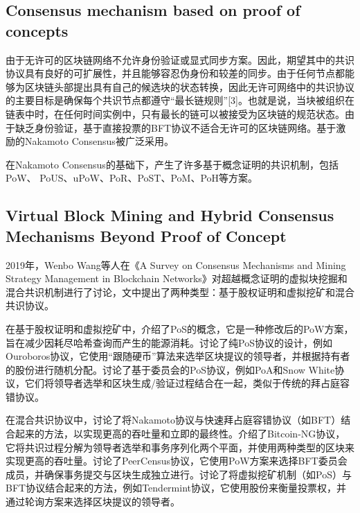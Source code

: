 \documentclass[a4paper,twoside]{scrbook}
\begin{document}
\begin{CJK}{UTF8}{gbsn}
\subsection{Consensus mechanism based on proof of concepts}
由于无许可的区块链网络不允许身份验证或显式同步方案。因此，期望其中的共识协议具有良好的可扩展性，并且能够容忍伪身份和较差的同步。由于任何节点都能够为区块链头部提出具有自己的候选块的状态转换，因此无许可网络中的共识协议的主要目标是确保每个共识节点都遵守“最长链规则”[3]。也就是说，当块被组织在链表中时，在任何时间实例中，只有最长的链可以被接受为区块链的规范状态。由于缺乏身份验证，基于直接投票的BFT协议不适合无许可的区块链网络。基于激励的Nakamoto Consensus\cite{nakamoto2008bitcoin}被广泛采用。

在Nakamoto Consensus的基础下，产生了许多基于概念证明的共识机制，包括PoW、
PoUS、uPoW、PoR、PoST、PoM、PoH等方案。

\subsection{Virtual Block Mining and Hybrid Consensus Mechanisms Beyond Proof of Concept}
2019年，Wenbo Wang等人在《A Survey on Consensus Mechanisms and Mining Strategy Management in Blockchain Networks》\cite{wang2019survey}对超越概念证明的虚拟块挖掘和混合共识机制进行了讨论，文中提出了两种类型：基于股权证明和虚拟挖矿和混合共识协议。

在基于股权证明和虚拟挖矿中，介绍了PoS的概念，它是一种修改后的PoW方案，旨在减少因耗尽哈希查询而产生的能源消耗。讨论了纯PoS协议的设计，例如Ouroboros协议，它使用“跟随硬币”算法来选举区块提议的领导者，并根据持有者的股份进行随机分配。讨论了基于委员会的PoS协议，例如PoA和Snow White协议，它们将领导者选举和区块生成/验证过程结合在一起，类似于传统的拜占庭容错协议。

在混合共识协议中，讨论了将Nakamoto协议与快速拜占庭容错协议（如BFT）结合起来的方法，以实现更高的吞吐量和立即的最终性。介绍了Bitcoin-NG协议，它将共识过程分解为领导者选举和事务序列化两个平面，并使用两种类型的区块来实现更高的吞吐量。讨论了PeerCensus协议，它使用PoW方案来选择BFT委员会成员，并确保事务提交与区块生成独立进行。讨论了将虚拟挖矿机制（如PoS）与BFT协议结合起来的方法，例如Tendermint协议，它使用股份来衡量投票权，并通过轮询方案来选择区块提议的领导者。
\printbibliography
\end{CJK}
\end{document}
